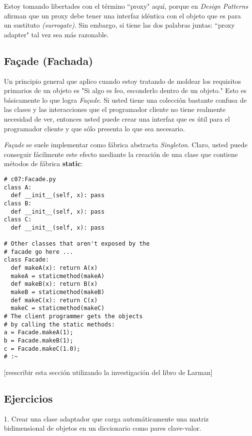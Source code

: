 Estoy tomando libertades con el término “proxy" aquí, porque en \textit{Design Patterns} afirman que un proxy debe tener una interfaz idéntica con el objeto que es para un sustituto \textit{(surrogate)}. Sin embargo, si tiene las dos palabras juntas: “proxy adapter" tal vez sea más razonable.  \newline

\subsection*{Façade (Fachada)}
\label{subsec:Fachada}

Un principio general que aplico cuando estoy tratando de moldear los requisitos primarios de un objeto es "Si algo es feo, esconderlo dentro de un objeto." Esto es básicamente lo que logra \textit{Façade}. Si usted tiene una colección bastante confusa de las clases y las interacciones que el programador cliente no tiene realmente necesidad de ver, entonces usted puede crear una interfaz que es útil para el programador cliente y que sólo presenta lo que sea necesario.

\textit{Façade} se suele implementar como fábrica abstracta \textit{Singleton}. Claro, usted puede conseguir fácilmente este efecto mediante la creación de una clase que contiene métodos de fábrica \textbf{static}:  \newline

\begin{lstlisting} 
# c07:Facade.py 
class A: 
  def __init__(self, x): pass 
class B: 
  def __init__(self, x): pass 
class C: 
  def __init__(self, x): pass 
  
# Other classes that aren't exposed by the 
# facade go here ... 
class Facade: 
  def makeA(x): return A(x) 
  makeA = staticmethod(makeA) 
  def makeB(x): return B(x) 
  makeB = staticmethod(makeB) 
  def makeC(x): return C(x) 
  makeC = staticmethod(makeC) 
# The client programmer gets the objects 
# by calling the static methods: 
a = Facade.makeA(1); 
b = Facade.makeB(1); 
c = Facade.makeC(1.0); 
# :~ 
\end{lstlisting}
[reescribir esta sección utilizando la investigación del libro de Larman]   \newline

\subsection*{Ejercicios}
\label{subsec:Ejercicios10}


1. Crear una clase adaptador que carga automáticamente una matriz bidimensional de objetos en un diccionario como pares clave-valor.

\newpage